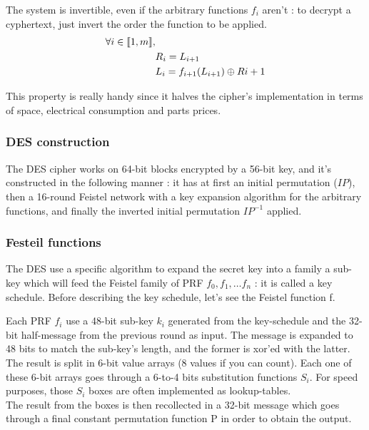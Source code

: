 The system is invertible, even if the arbitrary functions $f_i$ aren't : to decrypt a cyphertext, just invert the order the function to be applied. 
\begin{align}   
    \forall i \in \llbracket1,m\rrbracket,&                     \\
    &R_i = L_{i+1}                                              \\
    & L_i = f_{i+1}(L_{i+1}) \oplus R{i+1}                    
\end{align}

This property is really handy since it halves the cipher's implementation in terms of space, electrical consumption and parts prices.

\subsubsection{ DES construction }

The DES cipher works on 64-bit blocks encrypted by a 56-bit key, and it's constructed in the following manner : it has at first an initial permutation ($IP$), then a 16-round Feistel network with a key expansion algorithm for the arbitrary functions, and finally the inverted initial permutation $IP^{-1}$ applied.

\subsubsection{Festeil functions}

The DES use a specific algorithm to expand the secret key into a family a sub-key which will feed the Feistel family of PRF $f_0,f_1,\dots f_n$ : it is called a key schedule. Before describing the key schedule, let's see the Feistel function f. 

Each PRF $f_i$ use a 48-bit sub-key $k_i$ generated from the key-schedule and the 32-bit half-message from the previous round as input. The message is expanded to 48 bits to match the sub-key's length, and the former is xor'ed with the latter.\\
The result is split in 6-bit value arrays (8 values if you can count). Each one of these 6-bit arrays goes through a 6-to-4 bits substitution functions $S_i$. For speed purposes, those $S_i$ boxes are often implemented as lookup-tables. \\
The result from the boxes is then recollected in a 32-bit message which goes through a final constant permutation function P in order to obtain the output. \\

